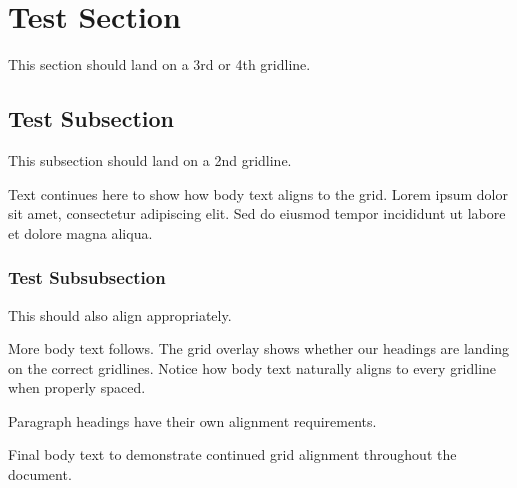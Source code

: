 \documentclass[11pt]{article}
\begin{document}
\section{Test Section}
This section should land on a 3rd or 4th gridline.

\subsection{Test Subsection}
This subsection should land on a 2nd gridline.

Text continues here to show how body text aligns to the grid. Lorem ipsum dolor sit amet, consectetur adipiscing elit. Sed do eiusmod tempor incididunt ut labore et dolore magna aliqua.

\subsubsection{Test Subsubsection}
This should also align appropriately.

More body text follows. The grid overlay shows whether our headings are landing on the correct gridlines. Notice how body text naturally aligns to every gridline when properly spaced.

Paragraph headings have their own alignment requirements.

Final body text to demonstrate continued grid alignment throughout the document.
\end{document}
